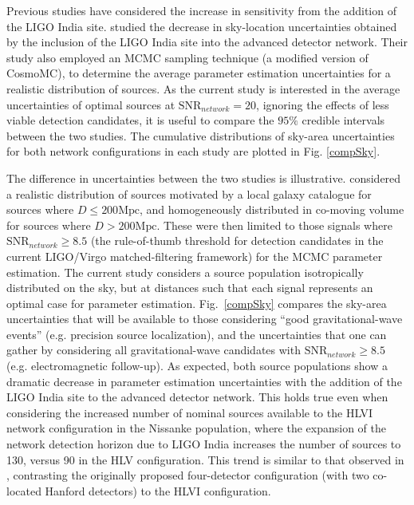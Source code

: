 \documentclass[11pt,a4paper]{emulateapj} 
\newcommand{\carl}[1]{{\color{red} #1}}
\begin{document}
Previous studies have considered the increase in sensitivity from the addition of the 
LIGO India site.  \cite{Nissanke2013} studied the decrease in
sky-location uncertainties obtained by the inclusion of the LIGO India site
into the advanced detector network.  Their study also employed an MCMC sampling technique 
 (a modified version of CosmoMC),
to determine the average parameter estimation uncertainties for a realistic distribution
of sources.  As the current study is interested in the \carl{average} uncertainties
of optimal sources at $\text{SNR}_{network}=20$, ignoring the effects of less viable 
detection candidates, it is useful to compare the $95\%$ credible intervals
between the two studies.  The cumulative distributions of sky-area uncertainties
for both network configurations in each study are plotted in Fig. \ref{compSky}.

The difference in uncertainties between the two studies is illustrative.  \cite{Nissanke2013}
considered a realistic distribution of sources motivated by a local galaxy catalogue for
 sources where $D\leq 200\text{Mpc}$, and homogeneously distributed in co-moving
 volume for sources where $D > 200\text{Mpc}$.  These were then limited to those signals
 where $\text{SNR}_{network} \geq 8.5$ (the \carl{rule-of-thumb} threshold for detection candidates in the
 current LIGO/Virgo matched-filtering framework) for the MCMC parameter estimation.
   The current study considers a source
 population isotropically distributed on the sky, but at distances such that each signal
 represents an optimal case for parameter estimation.   Fig.\ \ref{compSky} compares
 the sky-area uncertainties that will be available to those considering ``good 
 gravitational-wave events'' (e.g. precision source localization), and the 
 uncertainties that one can gather by considering all gravitational-wave candidates with 
 $\text{SNR}_{network}\geq 8.5$ (e.g. electromagnetic follow-up).  As expected, both source
 populations show a dramatic decrease in parameter estimation uncertainties with the
 addition of the LIGO India site to the advanced detector network.  This holds true even when
 considering the increased number of nominal sources available to the HLVI network 
 configuration in the Nissanke population, where the expansion of the network detection 
 horizon due to LIGO India increases the number of sources to 130, versus 90 in 
 the HLV configuration.  This trend is similar to that observed in \cite{Veitch2012}, contrasting
 the originally proposed four-detector configuration (with two co-located Hanford detectors) to 
 the HLVI configuration.
\end{document}
